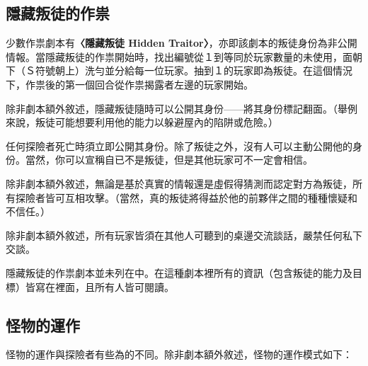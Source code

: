 
\subsection{隱藏叛徒的作祟} \label{ssec:haunts-with-a-hidden-traitor}

少數作祟劇本有\textbf{〈隱藏叛徒 Hidden Traitor〉}，亦即該劇本的叛徒身份為非公開情報。當隱藏叛徒的作祟開始時，找出編號從１到等同於玩家數量的未使用，面朝下（Ｓ符號朝上）洗勻並分給每一位玩家。抽到１的玩家即為叛徒。在這個情況下，作祟後的第一個回合從作祟揭露者左邊的玩家開始。

除非劇本額外敘述，隱藏叛徒隨時可以公開其身份——將其身份標記翻面。（舉例來說，叛徒可能想要利用他的能力以躲避屋內的陷阱或危險。）

任何探險者死亡時須立即公開其身份。除了叛徒之外，沒有人可以主動公開他的身份。當然，你可以宣稱自已不是叛徒，但是其他玩家可不一定會相信。

除非劇本額外敘述，無論是基於真實的情報還是虛假得猜測而認定對方為叛徒，所有探險者皆可互相攻擊。（當然，真的叛徒將得益於他的前夥伴之間的種種懷疑和不信任。）

除非劇本額外敘述，所有玩家皆須在其他人可聽到的桌邊交流談話，嚴禁任何私下交談。

\begin{RuleBox}{}
  隱藏叛徒的作祟劇本並未列在中。在這種劇本裡所有的資訊（包含叛徒的能力及目標）皆寫在裡面，且所有人皆可閱讀。
\end{RuleBox}


\subsection{怪物的運作}\label{ssec:how-monsters-work}

怪物的運作與探險者有些為的不同。除非劇本額外敘述，怪物的運作模式如下：

